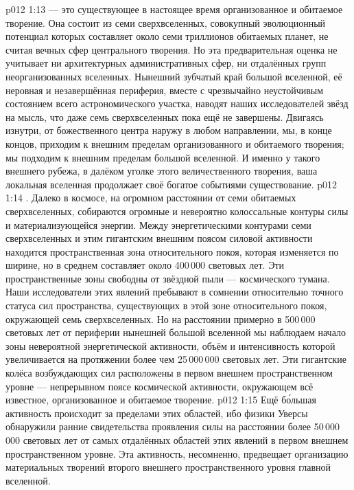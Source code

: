 \vs p012 1:13  --- это существующее в настоящее время организованное и обитаемое творение. Она состоит из семи сверхвселенных, совокупный эволюционный потенциал которых составляет около семи триллионов обитаемых планет, не считая вечных сфер центрального творения. Но эта предварительная оценка не учитывает ни архитектурных административных сфер, ни отдалённых групп неорганизованных вселенных. Нынешний зубчатый край большой вселенной, её неровная и незавершённая периферия, вместе с чрезвычайно неустойчивым состоянием всего астрономического участка, наводят наших исследователей звёзд на мысль, что даже семь сверхвселенных пока ещё не завершены. Двигаясь изнутри, от божественного центра наружу в любом направлении, мы, в конце концов, приходим к внешним пределам организованного и обитаемого творения; мы подходим к внешним пределам большой вселенной. И именно у такого внешнего рубежа, в далёком уголке этого величественного творения, ваша локальная вселенная продолжает своё богатое событиями существование.
\vs p012 1:14 . Далеко в космосе, на огромном расстоянии от семи обитаемых сверхвселенных, собираются огромные и невероятно колоссальные контуры силы и материализующейся энергии. Между энергетическими контурами семи сверхвселенных и этим гигантским внешним поясом силовой активности находится пространственная зона относительного покоя, которая изменяется по ширине, но в среднем составляет около 400\,000 световых лет. Эти пространственные зоны свободны от звёздной пыли --- космического тумана. Наши исследователи этих явлений пребывают в сомнении относительно точного статуса сил пространства, существующих в этой зоне относительного покоя, окружающей семь сверхвселенных. Но на расстоянии примерно в 500\,000 световых лет от периферии нынешней большой вселенной мы наблюдаем начало зоны невероятной энергетической активности, объём и интенсивность которой увеличивается на протяжении более чем 25\,000\,000 световых лет. Эти гигантские колёса возбуждающих сил расположены в первом внешнем пространственном уровне --- непрерывном поясе космической активности, окружающем всё известное, организованное и обитаемое творение.
\vs p012 1:15 Ещё б\'ольшая активность происходит за пределами этих областей, ибо физики Уверсы обнаружили ранние свидетельства проявления силы на расстоянии более 50\,000\,000 световых лет от самых отдалённых областей этих явлений в первом внешнем пространственном уровне. Эта активность, несомненно, предвещает организацию материальных творений второго внешнего пространственного уровня главной вселенной.
